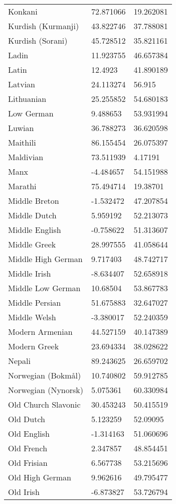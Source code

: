 \begin{longtable}{lll}
Konkani & 72.871066 & 19.262081\\
Kurdish (Kurmanji) & 43.822746 & 37.788081\\
Kurdish (Sorani) & 45.728512 & 35.821161\\
Ladin & 11.923755 & 46.657384\\
Latin & 12.4923 & 41.890189\\
Latvian & 24.113274 & 56.915\\
Lithuanian & 25.255852 & 54.680183\\
Low German & 9.488653 & 53.931994\\
Luwian & 36.788273 & 36.620598\\
Maithili & 86.155454 & 26.075397\\
Maldivian & 73.511939 & 4.17191\\
Manx & -4.484657 & 54.151988\\
Marathi & 75.494714 & 19.38701\\
Middle Breton & -1.532472 & 47.207854\\
Middle Dutch & 5.959192 & 52.213073\\
Middle English & -0.758622 & 51.313607\\
Middle Greek & 28.997555 & 41.058644\\
Middle High German & 9.717403 & 48.742717\\
Middle Irish & -8.634407 & 52.658918\\
Middle Low German & 10.68504 & 53.867783\\
Middle Persian & 51.675883 & 32.647027\\
Middle Welsh & -3.380017 & 52.240359\\
Modern Armenian & 44.527159 & 40.147389\\
Modern Greek & 23.694334 & 38.028622\\
Nepali & 89.243625 & 26.659702\\
Norwegian (Bokm\r{a}l) & 10.740802 & 59.912785\\
Norwegian (Nynorsk) & 5.075361 & 60.330984\\
Old Church Slavonic & 30.453243 & 50.415519\\
Old Dutch & 5.123259 & 52.09095\\
Old English & -1.314163 & 51.060696\\
Old French & 2.347857 & 48.854451\\
Old Frisian & 6.567738 & 53.215696\\
Old High German & 9.962616 & 49.795477\\
Old Irish & -6.873827 & 53.726794\\

\end{longtable}
